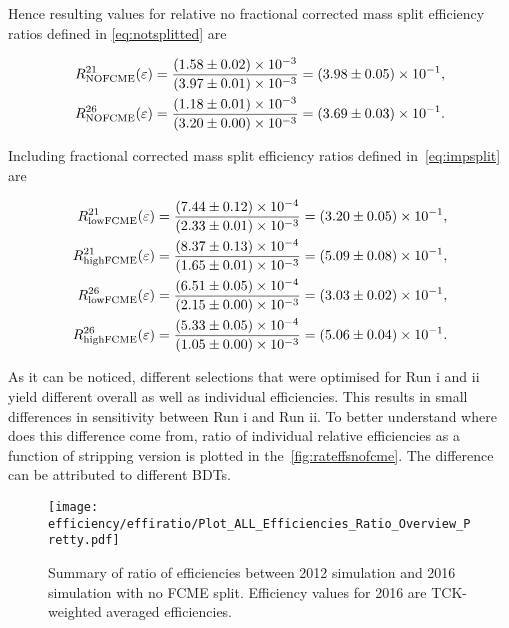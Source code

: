 Hence resulting values for relative no fractional corrected mass split efficiency ratios defined in \autoref{eq:notsplitted} are

\begin{equation}
\begin{aligned}
	R^{21}_{\rm{NOFCME}}(\varepsilon)=\frac{(1.58\pm0.02)\times 10 ^{-3 }}{(3.97\pm0.01)\times 10 ^{-3 }}=(3.98\pm0.05)\times 10 ^{-1 },\\
	R^{26}_{\rm{NOFCME}}(\varepsilon)=\frac{(1.18\pm0.01)\times 10 ^{-3 }}{(3.20\pm0.00)\times 10 ^{-3 }}=(3.69\pm0.03)\times 10 ^{-1 }.
\end{aligned}
\label{eq:nofcmeer}
\end{equation}


Including fractional corrected mass split efficiency ratios defined in~\autoref{eq:impsplit} are

\begin{equation}
\begin{aligned}
	R^{21}_{\rm{lowFCME}}(\varepsilon)=\frac{(7.44\pm0.12)\times 10 ^{-4 }}{(2.33\pm0.01)\times 10 ^{-3 }}=(3.20\pm0.05)\times 10 ^{-1 },\\
	R^{21}_{\rm{highFCME}}(\varepsilon)=\frac{(8.37\pm0.13)\times 10 ^{-4 }}{(1.65\pm0.01)\times 10 ^{-3 }}=(5.09\pm0.08)\times 10 ^{-1 },\\
	R^{26}_{\rm{lowFCME}}(\varepsilon)=\frac{(6.51\pm0.05)\times 10 ^{-4 }}{(2.15\pm0.00)\times 10 ^{-3 }}=(3.03\pm0.02)\times 10 ^{-1 },\\
	R^{26}_{\rm{highFCME}}(\varepsilon)=\frac{(5.33\pm0.05)\times 10 ^{-4 }}{(1.05\pm0.00)\times 10 ^{-3 }}=(5.06\pm0.04)\times 10 ^{-1 }.
\end{aligned}
\label{eq:allfcmeer}
\end{equation}
	
	
As it can be noticed, different selections that were optimised for Run \Rn{1} and \Rn{2} yield different overall as well as individual efficiencies. This results in small differences in sensitivity between Run \Rn{1} and Run \Rn{2}. To better understand where does this difference come from, ratio of individual relative efficiencies as a function of stripping version is plotted in the~\autoref{fig:rateffsnofcme}. The difference can be attributed to different BDTs.

\begin{figure}[H]
\centering
\texttt{[image: efficiency/effiratio/Plot\_ALL\_Efficiencies\_Ratio\_Overview\_Pretty.pdf]}
\caption{Summary of ratio of efficiencies between 2012 simulation and 2016 simulation with no FCME split. Efficiency values for 2016 are TCK-weighted averaged efficiencies.}
\centering
\label{fig:rateffsnofcme}
\end{figure}



